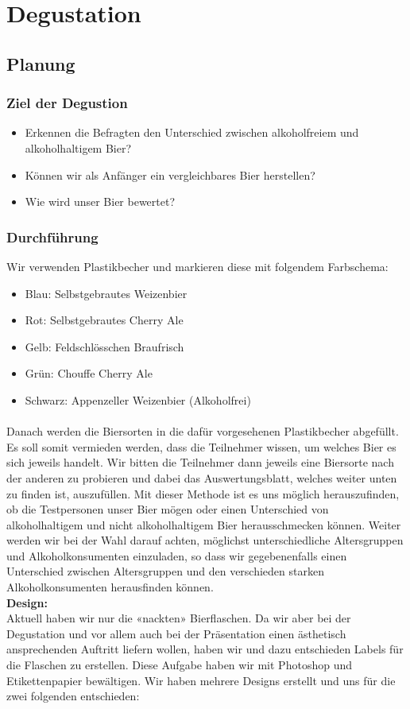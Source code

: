 \newpage
\section{Degustation}
\subsection{Planung}
\subsubsection{Ziel der Degustion}
\begin{itemize}
    \item Erkennen die Befragten den Unterschied zwischen alkoholfreiem und alkoholhaltigem Bier?
    \item Können wir als Anfänger ein vergleichbares Bier herstellen?
    \item Wie wird unser Bier bewertet?
\end{itemize}

\subsubsection{Durchführung}
Wir verwenden Plastikbecher und markieren diese mit folgendem Farbschema:
\begin{itemize}
    \item Blau: 	Selbstgebrautes Weizenbier
    \item Rot:		Selbstgebrautes Cherry Ale
    \item Gelb: 	Feldschlösschen Braufrisch 
    \item Grün:		Chouffe Cherry Ale 
    \item Schwarz:	Appenzeller Weizenbier (Alkoholfrei) 
\end{itemize}
\paragraph{}
Danach werden die Biersorten in die dafür vorgesehenen Plastikbecher abgefüllt. Es soll somit vermieden werden, dass die Teilnehmer wissen, um welches Bier es sich jeweils handelt.
Wir bitten die Teilnehmer dann jeweils eine Biersorte nach der anderen zu probieren und dabei das Auswertungsblatt, welches weiter unten zu finden ist, auszufüllen. Mit dieser Methode ist es uns möglich herauszufinden, ob die Testpersonen unser Bier mögen oder einen Unterschied von alkoholhaltigem und nicht alkoholhaltigem Bier herausschmecken können. Weiter werden wir bei der Wahl darauf achten, möglichst unterschiedliche Altersgruppen und Alkoholkonsumenten einzuladen, so dass wir gegebenenfalls einen Unterschied zwischen Altersgruppen und den verschieden starken Alkoholkonsumenten herausfinden können.
\\
\textbf{Design:}\\
Aktuell haben wir nur die «nackten» Bierflaschen. Da wir aber bei der Degustation und vor allem auch bei der Präsentation einen ästhetisch ansprechenden Auftritt liefern wollen, haben wir und dazu entschieden Labels für die Flaschen zu erstellen. Diese Aufgabe haben wir mit Photoshop und Etikettenpapier bewältigen. Wir haben mehrere Designs erstellt und uns für die zwei folgenden entschieden:

